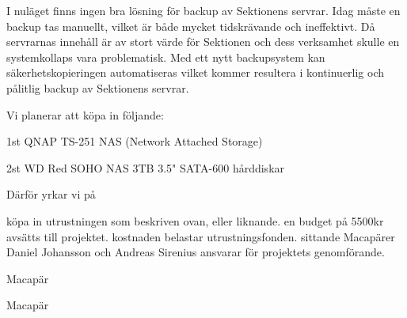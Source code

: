 \documentclass[../_main/handlingar.tex]{subfiles}
\begin{document}

I nuläget finns ingen bra lösning för backup av Sektionens servrar. Idag måste en backup tas manuellt, vilket är både mycket tidskrävande och ineffektivt. Då servrarnas innehåll är av stort värde för Sektionen och dess verksamhet skulle en systemkollaps vara problematisk. Med ett nytt backupsystem kan säkerhetskopieringen automatiseras vilket kommer resultera i kontinuerlig och pålitlig backup av Sektionens servrar.

Vi planerar att köpa in följande:
\begin{dashlist}
    \item 1st QNAP TS-251 NAS (Network Attached Storage)
    \item 2st WD Red SOHO NAS 3TB 3.5" SATA-600 hårddiskar
\end{dashlist}

Därför yrkar vi på
\begin{attsatser}
    \att köpa in utrustningen som beskriven ovan, eller liknande.
    \att en budget på 5500kr avsätts till projektet.
    \att kostnaden belastar utrustningsfonden.
    \att sittande Macapärer Daniel Johansson och Andreas Sirenius ansvarar för projektets genomförande.
\end{attsatser}

\begin{signatures}{2}
    \mvh
    \signature{Daniel Johansson}{Macapär}
    \signature{Andreas Sirenius}{Macapär}
\end{signatures}
\end{document}
